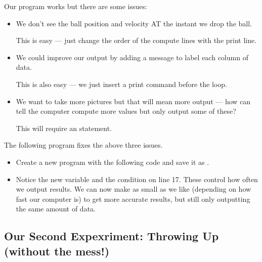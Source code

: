 \documentclass{coderdojo}
\newcommand\TODO[1]{
\begin{itemize}
\item[\todoSymbol] \color{todo} #1
\end{itemize}}
\begin{document}
\clearpage

Our program works but there are some issues:
\begin{itemize}
\item We don't see the ball position and velocity AT the instant we drop the ball.  

This is easy --- just change the order of the compute lines with the print line.

\item We could improve our output by adding a message to label each column of data.

This is also easy --- we just insert a print command before the  loop.

\item We want to take more pictures but that will mean more output --- how can tell the computer compute more values but only output some of these?

This will require an  statement.
\end{itemize}
 
The following program fixes the above three issues.

\TODO{Create a new program with the following code and save it as  \code{Drop_2.py}.}


\begin{itemize}
\item
Notice the new variable  and the  condition on line 17. These control how often we output results.  We can now make  as small as we like (depending on how fast our computer is) to get more accurate results, but still only outputting the same amount of data.

\end{itemize}
\subsection{Our Second Expexriment: Throwing Up (without the mess!)}

\end{document}
